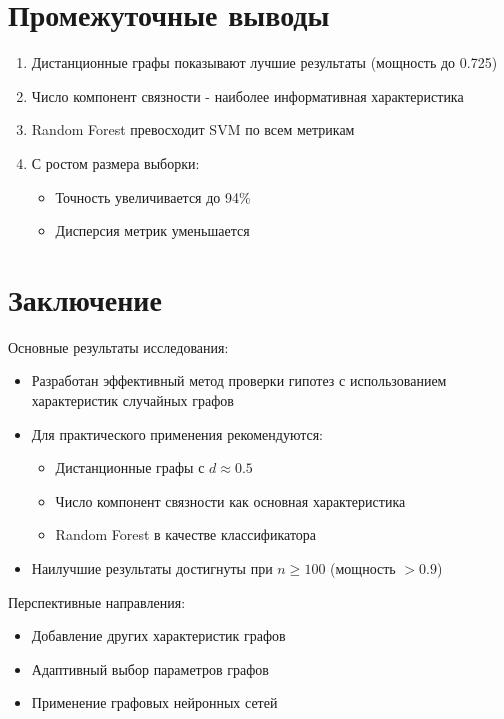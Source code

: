 \documentclass[a4paper, 12pt]{article}
\begin{document}
\section{Промежуточные выводы}
\begin{enumerate}
    \item Дистанционные графы показывают лучшие результаты (мощность до 0.725)
    \item Число компонент связности - наиболее информативная характеристика
    \item Random Forest превосходит SVM по всем метрикам
    \item С ростом размера выборки:
    \begin{itemize}
        \item Точность увеличивается до 94\% 
        \item Дисперсия метрик уменьшается
    \end{itemize}
\end{enumerate}

\section{Заключение}
Основные результаты исследования:
\begin{itemize}
    \item Разработан эффективный метод проверки гипотез с использованием характеристик случайных графов
    \item Для практического применения рекомендуются:
    \begin{itemize}
        \item Дистанционные графы с $d \approx 0.5$
        \item Число компонент связности как основная характеристика
        \item Random Forest в качестве классификатора
    \end{itemize}
    \item Наилучшие результаты достигнуты при $n \geq 100$ (мощность $> 0.9$)
\end{itemize}

Перспективные направления:
\begin{itemize}
    \item Добавление других характеристик графов
    \item Адаптивный выбор параметров графов
    \item Применение графовых нейронных сетей
\end{itemize}
\end{document}
